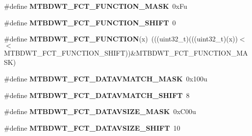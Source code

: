 \begin{DoxyCompactItemize}
\mbox{\label{group___m_t_b_d_w_t___register___masks_ga05376c97e9f6d9af8d411be187d45d4c}} 
\#define {\bfseries M\+T\+B\+D\+W\+T\+\_\+\+F\+C\+T\+\_\+\+F\+U\+N\+C\+T\+I\+O\+N\+\_\+\+M\+A\+SK}~0x\+Fu
\item 
\mbox{\label{group___m_t_b_d_w_t___register___masks_gae855270584ab08b726fd88c288d2e605}} 
\#define {\bfseries M\+T\+B\+D\+W\+T\+\_\+\+F\+C\+T\+\_\+\+F\+U\+N\+C\+T\+I\+O\+N\+\_\+\+S\+H\+I\+FT}~0
\item 
\mbox{\label{group___m_t_b_d_w_t___register___masks_ga14d63a7f56cfa9813f635e1bf3b2d1b0}} 
\#define {\bfseries M\+T\+B\+D\+W\+T\+\_\+\+F\+C\+T\+\_\+\+F\+U\+N\+C\+T\+I\+ON}(x)~(((uint32\+\_\+t)(((uint32\+\_\+t)(x))$<$$<$M\+T\+B\+D\+W\+T\+\_\+\+F\+C\+T\+\_\+\+F\+U\+N\+C\+T\+I\+O\+N\+\_\+\+S\+H\+I\+FT))\&M\+T\+B\+D\+W\+T\+\_\+\+F\+C\+T\+\_\+\+F\+U\+N\+C\+T\+I\+O\+N\+\_\+\+M\+A\+SK)
\item 
\mbox{\label{group___m_t_b_d_w_t___register___masks_ga470cbefd664513c09ba77981a1b21cf2}} 
\#define {\bfseries M\+T\+B\+D\+W\+T\+\_\+\+F\+C\+T\+\_\+\+D\+A\+T\+A\+V\+M\+A\+T\+C\+H\+\_\+\+M\+A\+SK}~0x100u
\item 
\mbox{\label{group___m_t_b_d_w_t___register___masks_ga97c08cb34ddc638585a0af94825ed2f5}} 
\#define {\bfseries M\+T\+B\+D\+W\+T\+\_\+\+F\+C\+T\+\_\+\+D\+A\+T\+A\+V\+M\+A\+T\+C\+H\+\_\+\+S\+H\+I\+FT}~8
\item 
\mbox{\label{group___m_t_b_d_w_t___register___masks_gac5562a9a6e64541583f2c3335e92e26e}} 
\#define {\bfseries M\+T\+B\+D\+W\+T\+\_\+\+F\+C\+T\+\_\+\+D\+A\+T\+A\+V\+S\+I\+Z\+E\+\_\+\+M\+A\+SK}~0x\+C00u
\item 
\mbox{\label{group___m_t_b_d_w_t___register___masks_gab273df7e6bc41ff730a16ed3bda34c0d}} 
\#define {\bfseries M\+T\+B\+D\+W\+T\+\_\+\+F\+C\+T\+\_\+\+D\+A\+T\+A\+V\+S\+I\+Z\+E\+\_\+\+S\+H\+I\+FT}~10
\item 
\mbox{\label{group___m_t_b_d_w_t___register___masks_ga5ab7bcca4526fbe61852979008a12b83}} 
$$
\end{DoxyCompactItemize}
